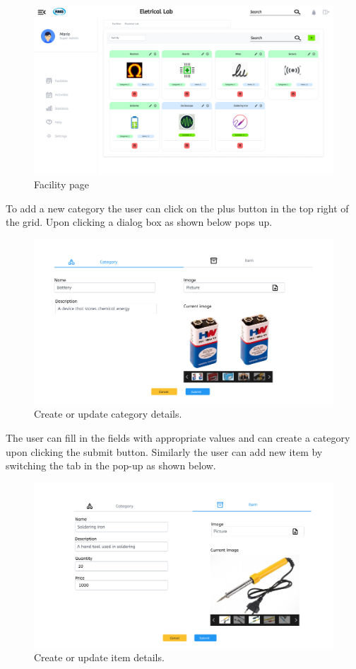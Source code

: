 \begin{figure}[H]
    \centering
    \includegraphics[scale=0.2]{images/Facility Info.png}
    \caption{Facility page}
    \label{fig:facility}
\end{figure}
To add a new category the user can click on the plus button in the top right of the grid. Upon clicking a dialog box as shown below pops up. 
\begin{figure}[H]
    \centering
    \includegraphics[scale=0.32]{images/CreateUpdate Category.png}
    \caption{Create or update category details.}
    \label{fig:cu-category}
\end{figure}
The user can fill in the fields with appropriate values and can create a category upon clicking the submit button.
Similarly the user can add new item by switching the tab in the pop-up as shown below.
\begin{figure}[H]
    \centering
    \includegraphics[scale=0.32]{images/CreateUpdate Item.png}
    \caption{Create or update item details.}
    \label{fig:cu-item}
\end{figure}
